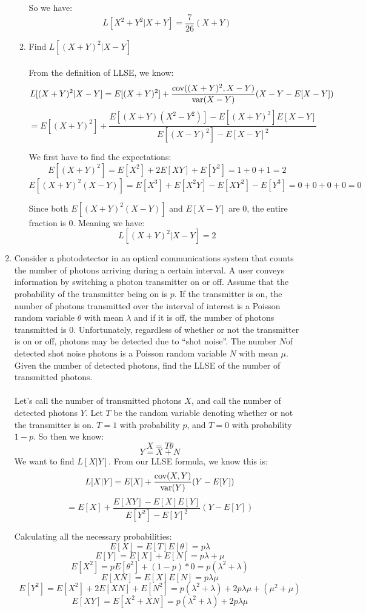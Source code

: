 \begin{enumerate}
\begin{enumerate}
        So we have:
        $$L[X^2 + Y^2 | X + Y] = \frac{7}{26}(X+Y)$$        

      \item Find $L[(X+Y)^2 | X-Y]$\\\\

        From the definition of LLSE, we know:
        $$L[(X+Y)^2 | X-Y] = E[(X+Y)^2] + \frac{\text{cov}((X+Y)^2,X-Y)}{\text{var}(X-Y)}(X-Y-E[X-Y])$$
        $$=E[(X+Y)^2] + \frac{E[(X+Y)(X^2-Y^2)] - E[(X+Y)^2]E[X-Y]}{E[(X-Y)^2] - E[X-Y]^2}$$

        We first have to find the expectations:
        $$E[(X+Y)^2] = E[X^2] + 2E[XY] + E[Y^2] = 1 + 0 + 1 = 2$$
        $$E[(X+Y)^2(X-Y)] = E[X^3] + E[X^2Y] - E[XY^2] - E[Y^3] = 0 + 0 + 0 + 0 = 0$$

        Since both $E[(X+Y)^2(X-Y)]$ and $E[X-Y]$ are $0$, the entire fraction is $0$. Meaning we have:
        $$L[(X+Y)^2 | X-Y] = 2$$
    \end{enumerate}


  \item Consider a photodetector in an optical communications system that counts the number of photons arriving during a certain interval. A user conveys information by switching a photon transmitter on or off. Assume that the probability of the transmitter being on is $p$. If the transmitter is on, the number of photons transmitted over the interval of interest is a Poisson random variable $\theta$ with mean $\lambda$ and if it is off, the number of photons transmitted is $0$. Unfortunately, regardless of whether or not the transmitter is on or off, photons may be detected due to ``shot noise''. The number $N$of detected shot noise photons is a Poisson random variable $N$ with mean $\mu$. Given the number of detected photons, find the LLSE of the number of transmitted photons.\\\\

    Let's call the number of transmitted photons $X$, and call the number of detected photons $Y$. Let $T$ be the random variable denoting whether or not the transmitter is on. $T=1$ with probability $p$, and $T=0$ with probability $1-p$. So then we know:
    $$X = T \theta$$
    $$Y = X + N$$
    We want to find $L[X|Y]$. From our LLSE formula, we know this is:
    $$L[X|Y] = E[X] + \frac{\text{cov}(X,Y)}{\text{var}(Y)}(Y - E[Y])$$
    $$=E[X] + \frac{E[XY] - E[X]E[Y]}{E[Y^2] - E[Y]^2}(Y - E[Y])$$

    Calculating all the necessary probabilities:
    $$E[X] = E[T] E[\theta] = p \lambda$$
    $$E[Y] = E[X] + E[N] = p \lambda + \mu$$
    $$E[X^2] = pE[\theta^2] + (1-p)*0 = p(\lambda^2 + \lambda)$$
    $$E[XN] = E[X]E[N] = p \lambda \mu$$
    $$E[Y^2] = E[X^2] + 2E[XN] + E[N^2] = p(\lambda^2 + \lambda) + 2p \lambda \mu + (\mu^2 + \mu)$$
    $$E[XY] = E[X^2 + XN] = p(\lambda^2 + \lambda) + 2p \lambda \mu$$


\end{enumerate}
